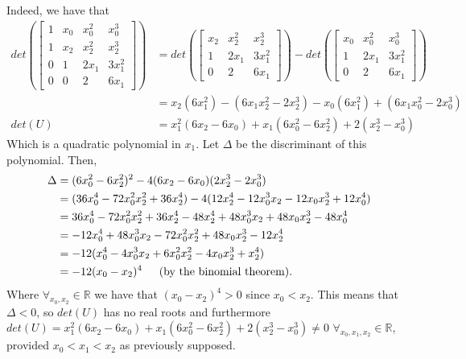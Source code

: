 \documentclass[11pt, letterpaper]{article}
\begin{document}
Indeed, we have that
\begin{align*}
    det\left(
   \begin{bmatrix}
       1 & x_0 & x_0^2 & x_0^3 \\
       1 & x_2 & x_2^2 & x_2^3 \\
       0 & 1 & 2x_1 & 3x_1^2 \\
       0 & 0 & 2 & 6x_1
   \end{bmatrix} 
    \right)&=det\left(
   \begin{bmatrix}
       x_2 & x_2^2 & x_2^3\\
       1 & 2x_1 & 3x_1^2\\
       0 & 2 & 6x_1
   \end{bmatrix}
   \right)-det\left(
   \begin{bmatrix}
       x_0 & x_0^2 & x_0^3\\
       1 & 2x_1 & 3x_1^2\\
       0 & 2 & 6x_1
   \end{bmatrix}
   \right)\\
   &=x_2(6x_1^2)-(6x_1x_2^2-2x_2^3)-x_0(6x_1^2)+(6x_1x_0^2-2x_0^3)\\
   det(U)&=x_1^2(6x_2-6x_0)+x_1(6x_0^2-6x_2^2)+2(x_2^3-x_0^3)
\end{align*}
Which is a quadratic polynomial in $x_1$. Let $\Delta$ be the discriminant of this polynomial. Then,
\begin{align*}
    \Delta&=(6x_0^2-6x_2^2)^2-4(6x_2-6x_0)(2x_2^3-2x_0^3)\\
    &=(36x_0^4-72x_0^2x_2^2+36x_2^4)-4(12x_2^4-12x_0^3x_2-12x_0x_2^3+12x_0^4)\\
    &=36x_0^4-72x_0^2x_2^2+36x_2^4-48x_2^4+48x_0^3x_2+48x_0x_2^3-48x_0^4\\
    &=-12x_0^4+48x_0^3x_2-72x_0^2x_2^2+48x_0x_2^3-12x_2^4\\
    &=-12(x_0^4-4x_0^3x_2+6x_0^2x_2^2-4x_0x_2^3+x_2^4)\\
    &=-12(x_0-x_2)^4 \text{\indent (by the binomial theorem).}
\end{align*}
Where $\forall_{x_0,x_2}\in\mathbb{R}$ we have that $(x_0-x_2)^4>0$ since $x_0<x_2$. This means that $\Delta<0$, 
so $det(U)$ has no real roots and furthermore $det(U)=x_1^2(6x_2-6x_0)+x_1(6x_0^2-6x_2^2)+2(x_2^3-x_0^3)\neq0$ $\forall_{x_0,x_1,x_2}\in\mathbb{R}$, provided $x_0<x_1<x_2$
as previously supposed.
\end{document}
